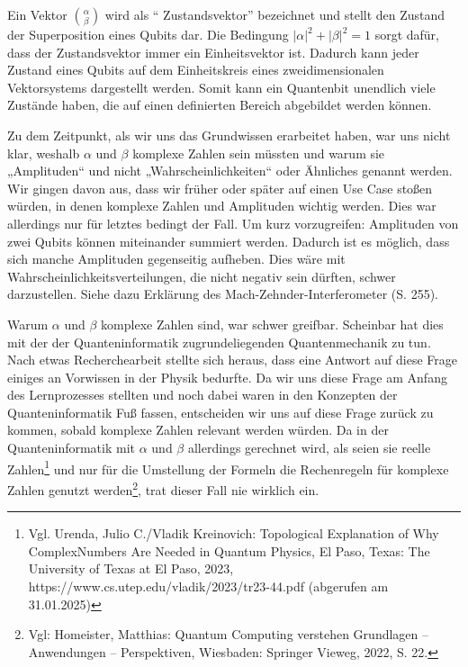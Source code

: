 Ein Vektor $\binom{\alpha}{\beta}$ wird als ``
Zustandsvektor'' bezeichnet und stellt den Zustand der Superposition eines Qubits dar. Die Bedingung $\left|\alpha\right|^2+\left|\beta\right|^2=1$ sorgt dafür, dass der Zustandsvektor immer ein Einheitsvektor ist. Dadurch kann jeder Zustand eines Qubits auf dem Einheitskreis eines zweidimensionalen Vektorsystems dargestellt werden. Somit kann ein Quantenbit unendlich viele Zustände haben, die auf einen definierten Bereich abgebildet werden können. 

\begin{tcolorbox}[title=Kommentar,
    title filled=false,
    colback=cyan!5!white,
    colframe=cyan!75!black]
Zu dem Zeitpunkt, als wir uns das Grundwissen erarbeitet haben, war uns nicht klar, weshalb $\alpha$ und $\beta$ komplexe Zahlen sein müssten und warum sie „Amplituden“ und nicht „Wahrscheinlichkeiten“ oder Ähnliches genannt werden. Wir gingen davon aus, dass wir früher oder später auf einen Use Case stoßen würden, in denen komplexe Zahlen und Amplituden wichtig werden. Dies war allerdings nur für letztes bedingt der Fall. Um kurz vorzugreifen: Amplituden von zwei Qubits können miteinander summiert werden. Dadurch ist es möglich, dass sich manche Amplituden gegenseitig aufheben. Dies wäre mit Wahrscheinlichkeitsverteilungen, die nicht negativ sein dürften, schwer darzustellen. Siehe dazu Erklärung des Mach-Zehnder-Interferometer (S. 255).

Warum $\alpha$ und $\beta$ komplexe Zahlen sind, war schwer greifbar. Scheinbar hat dies mit der der Quanteninformatik zugrundeliegenden Quantenmechanik zu tun. Nach etwas Recherchearbeit stellte sich heraus, dass eine Antwort auf diese Frage einiges an Vorwissen in der Physik bedurfte. Da wir uns diese Frage am Anfang des Lernprozesses stellten und noch dabei waren in den Konzepten der Quanteninformatik Fuß fassen, entscheiden wir uns auf diese Frage zurück zu kommen, sobald komplexe Zahlen relevant werden würden. Da in der Quanteninformatik mit $\alpha$ und $\beta$ allerdings gerechnet wird, als seien sie reelle Zahlen\footnote{Vgl. Urenda, Julio C./Vladik Kreinovich: Topological Explanation of Why ComplexNumbers Are Needed in Quantum Physics, El Paso, Texas: The University of Texas at El Paso, 2023, https://www.cs.utep.edu/vladik/2023/tr23-44.pdf (abgerufen am 31.01.2025)} und nur für die Umstellung der Formeln die Rechenregeln für komplexe Zahlen genutzt werden\footnote{Vgl: Homeister, Matthias: Quantum Computing verstehen Grundlagen – Anwendungen –
Perspektiven, Wiesbaden: Springer Vieweg, 2022, S. 22.}, trat dieser Fall nie wirklich ein. 


\end{tcolorbox}
